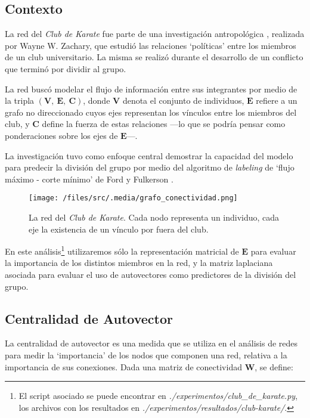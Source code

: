 
\vspace{1em}
\subsection{Contexto}

La red del \textit{Club de Karate} fue parte de una investigación antropológica \cite{Zachary}, realizada por Wayne W. Zachary, que estudió las relaciones `políticas' entre los miembros de un club universitario. La misma se realizó durante el desarrollo de un conflicto que terminó por dividir al grupo. 

La red buscó modelar el flujo de información entre sus integrantes por medio de la tripla $(\mathbf{V},\ \mathbf{E},\ \mathbf{C})$, donde $\mathbf{V}$ denota el conjunto de individuos, $\mathbf{E}$ refiere a un grafo no direccionado cuyos ejes representan los vínculos entre los miembros del club, y $\mathbf{C}$ define la fuerza de estas relaciones ---lo que se podría pensar como ponderaciones sobre los ejes de $\mathbf{E}$---. 

\vspace{1em}
La investigación tuvo como enfoque central demostrar la capacidad del modelo para predecir la división del grupo por medio del algoritmo de \textit{labeling} de `flujo máximo - corte mínimo' de Ford y Fulkerson \cite{Ford}.

\vspace{1em}
\begin{figure}[!htbp]
\texttt{[image: /files/src/.media/grafo\_conectividad.png]}
\caption{La red del \textit{Club de Karate}. Cada nodo representa un individuo, cada eje la existencia de un vínculo por fuera del club.}
\end{figure}


\vspace{1em}
En este análisis\footnote{El script asociado se puede encontrar en \textit{./experimentos/club\_de\_karate.py}, los archivos con los resultados en \textit{./experimentos/resultados/club-karate/}.} utilizaremos sólo la representación matricial de $\mathbf{E}$ para evaluar la importancia de los distintos miembros en la red, y la matriz laplaciana asociada para evaluar el uso de autovectores como predictores de la división del grupo. 




\newpage
\vspace{2em}
\subsection{Centralidad de Autovector} La centralidad de autovector es una medida que se utiliza en el análisis de redes para medir la `importancia' de los nodos que componen una red, relativa a la importancia de sus conexiones. Dada una matriz de conectividad \textbf{W}, se define:

